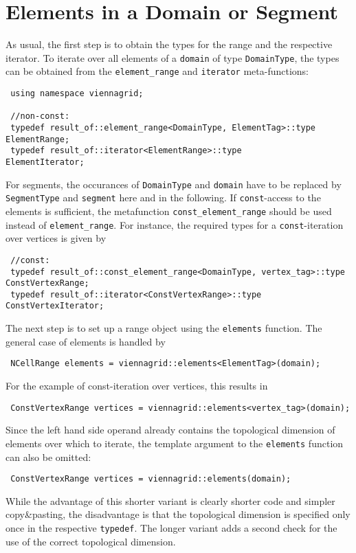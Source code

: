 \section{Elements in a Domain or Segment}
As usual, the first step is to obtain the types for the range and the respective iterator.
To iterate over all elements of a \lstinline|domain| of type \lstinline|DomainType|, the types can be obtained from the \lstinline|element_range| and \lstinline|iterator| meta-functions:
\begin{lstlisting}
 using namespace viennagrid;

 //non-const:
 typedef result_of::element_range<DomainType, ElementTag>::type ElementRange;
 typedef result_of::iterator<ElementRange>::type                ElementIterator;
\end{lstlisting}
For segments, the occurances of \lstinline|DomainType| and \lstinline|domain| have to be replaced by \lstinline|SegmentType| and \lstinline|segment| here and in the following.
If \lstinline|const|-access to the elements is sufficient, the metafunction \lstinline|const_element_range| should be used instead of \lstinline|element_range|.
For instance, the required types for a \lstinline|const|-iteration over vertices is given by
\begin{lstlisting}
 //const:
 typedef result_of::const_element_range<DomainType, vertex_tag>::type   ConstVertexRange;
 typedef result_of::iterator<ConstVertexRange>::type         ConstVertexIterator;
\end{lstlisting}

The next step is to set up a range object using the \lstinline|elements| function.
The general case of elements is handled by
\begin{lstlisting}
 NCellRange elements = viennagrid::elements<ElementTag>(domain);
\end{lstlisting}
For the example of const-iteration over vertices, this results in
\begin{lstlisting}
 ConstVertexRange vertices = viennagrid::elements<vertex_tag>(domain);
\end{lstlisting}
Since the left hand side operand already contains the topological dimension of elements over which to iterate, 
the template argument to the \lstinline|elements| function can also be omitted:
\begin{lstlisting}
 ConstVertexRange vertices = viennagrid::elements(domain);
\end{lstlisting}
While the advantage of this shorter variant is clearly shorter code and simpler copy\&pasting, the disadvantage is that the topological dimension is specified only once in the respective \lstinline|typedef|. The longer variant adds a second check for the use of the correct topological dimension.

